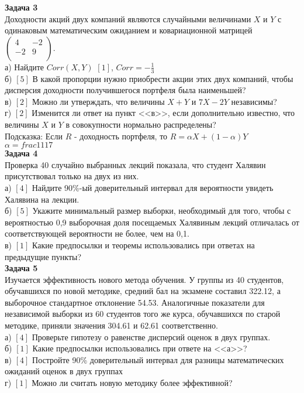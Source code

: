 \documentclass[pdftex,12pt,a4paper]{article}
\begin{document}
\textbf{Задача 3} \\ %
Доходности акций двух компаний являются случайными величинами $X$
и $Y$ с одинаковым математическим ожиданием и ковариационной
матрицей  $\left(%
\begin{array}{cc}
  4 & -2 \\
  -2 & 9 \\
\end{array}%
\right).$ \\
а) Найдите $Corr(X,Y)$  $[1]$, $Corr=-\frac{1}{3}$\\
б) $[5]$ В какой пропорции нужно приобрести акции этих двух
компаний,
чтобы дисперсия доходности получившегося портфеля была наименьшей? \\
в)  $[2]$ Можно ли утверждать, что величины $X+Y$ и $7X-2Y$ независимы? \\
г) $[2]$ Изменится ли ответ на пункт <<в>>, если дополнительно
известно,
что величины $X$ и $Y$ в совокупности нормально распределены? \\
Подсказка: Если $R$ - доходность портфеля, то $R=\alpha
X+(1-\alpha)Y$ \\
$\alpha=frac{11}{17}$ \\

\textbf{Задача 4} \\ %
Проверка 40 случайно выбранных лекций показала, что студент
Халявин присутствовал только на двух из них. \\
а) $[4]$ Найдите 90\%-ый доверительный интервал для вероятности
увидеть Халявина на лекции. \\
б) $[5]$ Укажите минимальный размер выборки, необходимый для того,
чтобы с вероятностью 0,9 выборочная доля посещаемых Халявиным
лекций
отличалась от соответствующей вероятности не более, чем на 0,1. \\
в) $[1]$ Какие предпосылки и теоремы использовались при ответах на предыдущие пункты? \\


\textbf{Задача 5} \\ %
Изучается эффективность нового метода обучения. У группы из 40
студентов, обучавшихся по новой методике, средний бал на экзамене
составил 322.12, а выборочное стандартное отклонение 54.53.
Аналогичные показатели для независимой выборки из 60 студентов
того же курса, обучавшихся по старой методике,
приняли значения 304.61 и 62.61 соответственно. \\
а) $[4]$ Проверьте гипотезу о равенстве дисперсий оценок в двух
группах.
\\
б) $[1]$ Какие предпосылки использовались при ответе на <<а>>? \\
в) $[4]$ Постройте 90\% доверительный интервал для разницы
математических ожиданий оценок в двух группах \\
г) $[1]$ Можно ли считать новую методику более эффективной? \\
\end{document}
